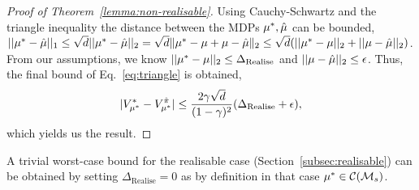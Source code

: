 \begin{proof}[Proof of Theorem~\ref{lemma:non-realisable}]
Using Cauchy-Schwartz and the triangle inequality the distance between the MDPs $\mu^{*}, \hat{\mu}$ can be bounded, $||\mu^{*}-\hat{\mu}||_1\leq\sqrt{d}||\mu^{*}-\hat{\mu}||_2 =\sqrt{d}\|\mu^*-\mu+\mu-\hat{\mu}\|_2\leq\sqrt{d}(||\mu^{*}-\mu||_2+||\mu-\hat{\mu}||_2)$. From our assumptions, we know $||\mu^{*}-\mu||_2\leq \Delta_{\mathrm{Realise}}$ and $||\mu-\hat{\mu}||_2 \leq \epsilon$. Thus, the final bound of Eq.~\ref{eq:triangle} is obtained,
\begin{equation}\label{eq:bias_bound}
|V_{{\mu^*}}^{*}-V_{{\mu^*}}^{\hat{\pi}}| \leq \frac{2\gamma\sqrt{d}}{(1-\gamma)^2}(\Delta_{\mathrm{Realise}}+\epsilon),
\end{equation}
which yields us the result.
\end{proof}

\begin{remark}
A trivial worst-case bound for the realisable case (Section~\ref{subsec:realisable}) can be obtained by setting $\Delta_{\mathrm{Realise}}=0$ as by definition in that case $\mu^{*} \in \mathcal{C}(\mathcal{M}_s)$.
\end{remark}
